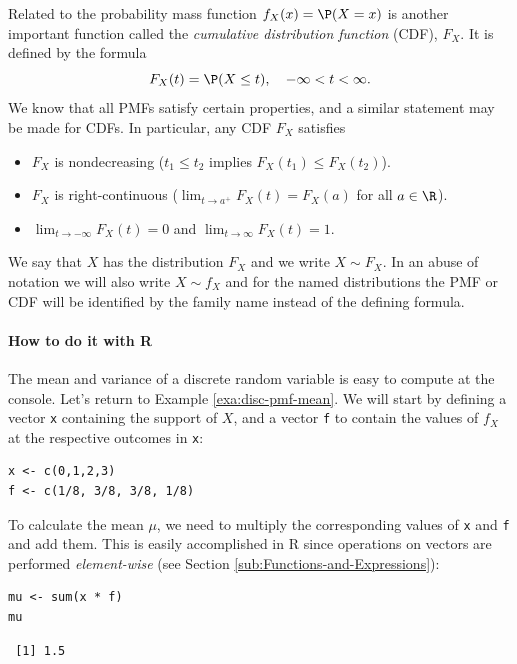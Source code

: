 \documentclass[captions=tableheading]{scrbook}
\begin{document}
Related to the probability mass function \(f_{X}(x)=\P(X=x)\) is another important function called the \emph{cumulative distribution function} (CDF), \(F_{X}\). It is defined by the formula
\begin{equation}
F_{X}(t)=\P(X\leq t),\quad-\infty<t<\infty.
\end{equation}
We know that all PMFs satisfy certain properties, and a similar statement may be made for CDFs. In particular, any CDF \(F_{X}\) satisfies
\begin{itemize}
\item \(F_{X}\) is nondecreasing (\(t_{1}\leq t_{2}\) implies \(F_{X}(t_{1})\leq F_{X}(t_{2})\)).
\item \(F_{X}\) is right-continuous (\(\lim_{t\to a^{+}}F_{X}(t)=F_{X}(a)\) for all \(a\in\R\)).
\item \(\lim_{t\to-\infty}F_{X}(t)=0\) and \(\lim_{t\to\infty}F_{X}(t)=1\).
\end{itemize}
We say that \(X\) has the distribution \(F_{X}\) and we write \(X\sim F_{X}\). In an abuse of notation we will also write \(X\sim f_{X}\) and for the named distributions the PMF or CDF will be identified by the family name instead of the defining formula.

\paragraph*{How to do it with \textsf{R}}
\label{sub:disc-rv-how-r}

The mean and variance of a discrete random variable is easy to compute at the console. Let's return to Example \ref{exa:disc-pmf-mean}. We will start by defining a vector \texttt{x} containing the support of \(X\), and a vector \texttt{f} to contain the values of \(f_{X}\) at the respective outcomes in \texttt{x}:


\begin{verbatim}
x <- c(0,1,2,3)
f <- c(1/8, 3/8, 3/8, 1/8)
\end{verbatim}

To calculate the mean \(\mu\), we need to multiply the corresponding values of \texttt{x} and \texttt{f} and add them. This is easily accomplished in \textsf{R} since operations on vectors are performed \emph{element-wise} (see Section \ref{sub:Functions-and-Expressions}): 


\begin{verbatim}
mu <- sum(x * f)
mu
\end{verbatim}

\begin{verbatim}
 [1] 1.5
\end{verbatim}
\end{document}
